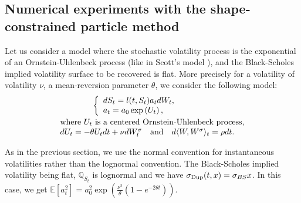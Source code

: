 \documentclass[a4paper]{article}
\newcommand{\1}{\textbf{1}}
\newcommand{\Q}{\mathbb{Q}}
\newcommand{\E}{\mathbb{E}}
\begin{document}
\subsection{Numerical experiments with the shape-constrained particle method}\label{sec:particle_method_numerical}
\par Let us consider a model where the stochastic volatility process is the exponential of an Ornstein-Uhlenbeck process (like in Scott's model \cite{ScottStochasticVolatility87}), and the Black-Scholes implied volatility surface to be recovered is flat. More precisely for a volatility of volatility $\nu$, a mean-reversion parameter $\theta$, we consider the following model:
\begin{equation}\label{eq:model_slv1}
\begin{array}{l}
\qquad \qquad \left\{\begin{array}{ll}
d S_t = l(t, S_t) a_t dW_t,\\
a_t = a_0 \exp\left( U_t \right),\end{array}\right.\\[3mm]
\textnormal{where} \ U_t \ \textnormal{is a centered Ornstein-Uhlenbeck process,} \\
dU_t = -\theta U_t dt + \nu dW_t^\sigma \quad \textnormal{and} \quad d \langle W, W^\sigma \rangle_t = \rho dt. 
\end{array}
\end{equation}
\par \noindent As in the previous section, we use the normal convention for instantaneous volatilities rather than the lognormal convention. The Black-Scholes implied volatility being flat, $\Q_{S_t}$ is lognormal and we have  $\sigma_{\textnormal{Dup}}(t,x) = \sigma_{BS} x$. In this case, we get $\E[a_t^2] = a_0^2 \exp\left(\frac{\nu^2}{\theta}\left(1 - e^{-2 \theta t}\right)\right)$.
\end{document}
